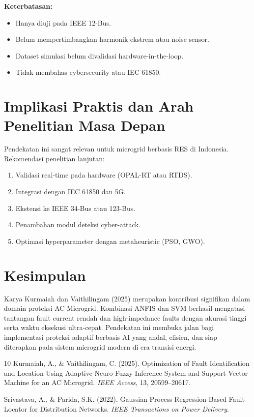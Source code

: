 \documentclass{article}
\begin{document}
\textbf{Keterbatasan:}
\begin{itemize}
    \item Hanya diuji pada IEEE 12-Bus.
    \item Belum mempertimbangkan harmonik ekstrem atau noise sensor.
    \item Dataset simulasi belum divalidasi hardware-in-the-loop.
    \item Tidak membahas cybersecurity atau IEC 61850.
\end{itemize}

\section{Implikasi Praktis dan Arah Penelitian Masa Depan}
Pendekatan ini sangat relevan untuk microgrid berbasis RES di Indonesia. Rekomendasi penelitian lanjutan:
\begin{enumerate}
    \item Validasi real-time pada hardware (OPAL-RT atau RTDS).
    \item Integrasi dengan IEC 61850 dan 5G.
    \item Ekstensi ke IEEE 34-Bus atau 123-Bus.
    \item Penambahan modul deteksi cyber-attack.
    \item Optimasi hyperparameter dengan metaheuristic (PSO, GWO).
\end{enumerate}

\section{Kesimpulan}
Karya Kurmaiah dan Vaithilingam (2025) merupakan kontribusi signifikan dalam domain proteksi AC Microgrid. Kombinasi ANFIS dan SVM berhasil mengatasi tantangan fault current rendah dan high-impedance faults dengan akurasi tinggi serta waktu eksekusi ultra-cepat. Pendekatan ini membuka jalan bagi implementasi proteksi adaptif berbasis AI yang andal, efisien, dan siap diterapkan pada sistem microgrid modern di era transisi energi.

\begin{thebibliography}{10}
 Kurmaiah, A., \& Vaithilingam, C. (2025). Optimization of Fault Identification and Location Using Adaptive Neuro-Fuzzy Inference System and Support Vector Machine for an AC Microgrid. \textit{IEEE Access}, 13, 20599--20617.

 Srivastava, A., \& Parida, S.K. (2022). Gaussian Process Regression-Based Fault Locator for Distribution Networks. \textit{IEEE Transactions on Power Delivery}.

\end{thebibliography}
\end{document}
